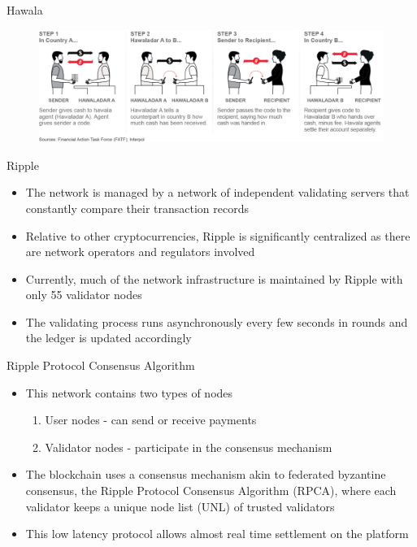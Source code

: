 \documentclass[10pt]{beamer}
\begin{document}

\begin{frame}{Hawala}
	\begin{figure}[]
		\centering
		\includegraphics  [scale=0.3]{Images/hawala}
	\end{figure}
\end{frame}


\begin{frame}{Ripple}
	\begin{itemize}
		\item The network is managed by a network of independent validating servers that constantly compare their transaction records
		\item Relative to other cryptocurrencies, Ripple is significantly centralized as there are network operators and regulators involved
		\item Currently, much of the network infrastructure is maintained by Ripple with only 55 validator nodes
		\item The validating process runs asynchronously every few seconds in rounds and the ledger is updated accordingly
	\end{itemize}
\end{frame}


\begin{frame}{Ripple Protocol Consensus Algorithm}
	\begin{itemize}
		\item This network contains two types of nodes
		\begin{enumerate}
			\item User nodes - can send or receive payments
			\item Validator nodes - participate in the consensus mechanism
		\end{enumerate}
		\item The blockchain uses a consensus mechanism akin to federated byzantine consensus, the Ripple Protocol Consensus Algorithm (RPCA), where each validator keeps a unique node list (UNL) of trusted validators
		\item This low latency protocol allows almost real time settlement on the platform
	\end{itemize}
\end{frame}
\end{document}
